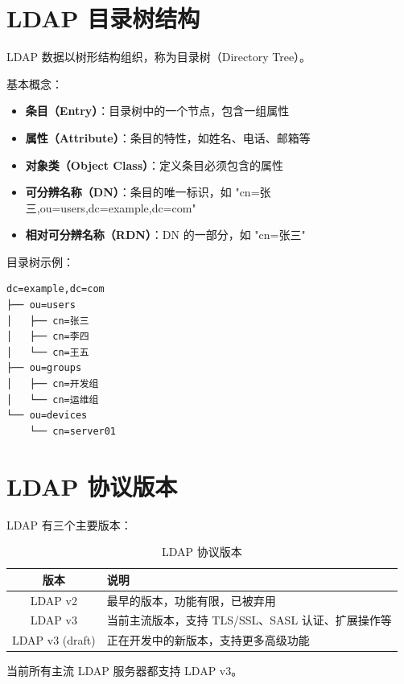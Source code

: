 \documentclass[12pt,UTF8]{ctexbook}
\begin{document}
\section{LDAP 目录树结构}
\label{sec:ldap_directory_tree}

LDAP 数据以树形结构组织，称为目录树（Directory Tree）。

基本概念：
\begin{itemize}
    \item \textbf{条目（Entry）}：目录树中的一个节点，包含一组属性
    \item \textbf{属性（Attribute）}：条目的特性，如姓名、电话、邮箱等
    \item \textbf{对象类（Object Class）}：定义条目必须包含的属性
    \item \textbf{可分辨名称（DN）}：条目的唯一标识，如 "cn=张三,ou=users,dc=example,dc=com"
    \item \textbf{相对可分辨名称（RDN）}：DN 的一部分，如 "cn=张三"
\end{itemize}

目录树示例：
\begin{verbatim}
dc=example,dc=com
├── ou=users
│   ├── cn=张三
│   ├── cn=李四
│   └── cn=王五
├── ou=groups
│   ├── cn=开发组
│   └── cn=运维组
└── ou=devices
    └── cn=server01
\end{verbatim}

\section{LDAP 协议版本}
\label{sec:ldap_versions}

LDAP 有三个主要版本：

\begin{table}[htbp]
    \centering
    \caption{LDAP 协议版本}
    \begin{tabular}{|c|p{8cm}|}
        \hline
        \textbf{版本} & \textbf{说明} \\
        \hline
        LDAP v2 & 最早的版本，功能有限，已被弃用 \\
        \hline
        LDAP v3 & 当前主流版本，支持 TLS/SSL、SASL 认证、扩展操作等 \\
        \hline
        LDAP v3 (draft) & 正在开发中的新版本，支持更多高级功能 \\
        \hline
    \end{tabular}
\end{table}

当前所有主流 LDAP 服务器都支持 LDAP v3。
\end{document}
